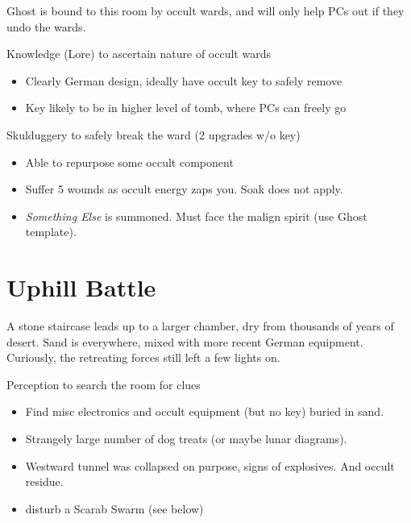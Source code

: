 \documentclass{book}
\newcommand{\df}{\DifficultyDie }
\newcommand{\stb}{\SetbackDie }
\begin{document}
\begin{multicols}{2}
Ghost is bound to this room by occult wards, and will only help PCs out if they undo the wards.

    \df\df Knowledge (Lore) to ascertain nature of occult wards
    \begin{itemize}
        \item \Success Clearly German design, ideally have occult key to safely remove
        \item \Advantage Key likely to be in higher level of tomb, where PCs can freely go
    \end{itemize}

\df\df\stb\stb Skulduggery to safely break the ward (2 upgrades w/o key)
    \begin{itemize}
        \item \Advantage Able to repurpose some occult component
        \item \Failure Suffer 5 wounds as occult energy zaps you.  Soak does not apply.
        \item \Despair \emph{Something Else} is summoned.  Must face the malign spirit (use Ghost template).
    \end{itemize}

\section{Uphill Battle}

A stone staircase leads up to a larger chamber, dry from thousands of years of desert.  Sand is everywhere, mixed with more recent German equipment.  Curiously, the retreating forces still left a few lights on.

\df\df\stb Perception to search the room for clues
    \begin{itemize}
        \item \Success Find misc electronics and occult equipment (but no key) buried in sand.
        \item \Advantage Strangely large number of dog treats (or maybe lunar diagrams).
        \item \Advantage Westward tunnel was collapsed on purpose, signs of explosives.  And occult residue.
        \item \Threat\Threat disturb a Scarab Swarm (see below)
    \end{itemize}


\end{multicols}
\end{document}
